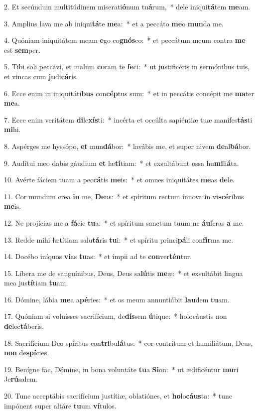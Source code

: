 2. Et secúndum multitúdinem miserati\textbf{ó}num tu\textbf{á}rum,~*  dele iniqui\textbf{tá}tem \textbf{me}am.\

3. Amplius lava me ab iniqui\textbf{tá}te \textbf{me}a:~*  et a peccáto \textbf{me}o \textbf{mun}da me.\

4. Quóniam iniquitátem meam \textbf{e}go co\textbf{gnós}co:~*  et peccátum meum contra \textbf{me} est \textbf{sem}per.\

5. Tibi soli peccávi, et malum \textbf{co}ram te \textbf{fe}ci:~*  ut justificéris in sermónibus tuis, et vincas cum \textbf{ju}di\textbf{cá}ris.\

6. Ecce enim in iniquitáti\textbf{bus} con\textbf{cép}tus sum:~*  et in peccátis concépit me \textbf{ma}ter \textbf{me}a.\

7. Ecce enim veritátem \textbf{di}le\textbf{xís}ti:~*  incérta et occúlta sapiéntiæ tuæ manifes\textbf{tás}ti \textbf{mi}hi.\

8. Aspérges me hyssópo, \textbf{et} mun\textbf{dá}bor:~*  lavábis me, et super nivem \textbf{de}al\textbf{bá}bor.\

9. Audítui meo dabis gáudium \textbf{et} læ\textbf{tí}tiam:~*  et exsultábunt ossa hu\textbf{mi}li\textbf{á}ta.\

10. Avérte fáciem tuam a pec\textbf{cá}tis \textbf{me}is:~*  et omnes iniquitátes \textbf{me}as \textbf{de}le.\

11. Cor mundum crea \textbf{in} me, \textbf{De}us:~*  et spíritum rectum ínnova in vi\textbf{scé}ribus \textbf{me}is.\

12. Ne projícias me a \textbf{fá}cie \textbf{tu}a:~*  et spíritum sanctum tuum ne \textbf{áu}feras \textbf{a} me.\

13. Redde mihi lætítiam salu\textbf{tá}ris \textbf{tu}i:~*  et spíritu princi\textbf{pá}li con\textbf{fír}ma me.\

14. Docébo iníquos \textbf{vi}as \textbf{tu}as:~*  et ímpii ad te \textbf{con}ver\textbf{tén}tur.\

15. Líbera me de sanguínibus, Deus, Deus sa\textbf{lú}tis \textbf{me}æ:~*  et exsultábit lingua mea jus\textbf{tí}tiam \textbf{tu}am.\

16. Dómine, lábia \textbf{me}a a\textbf{pé}ries:~*  et os meum annuntiábit \textbf{lau}dem \textbf{tu}am.\

17. Quóniam si voluísses sacrifícium, de\textbf{dís}sem \textbf{ú}tique:~*  holocáustis non \textbf{de}lec\textbf{tá}beris.\

18. Sacrifícium Deo spíritus con\textbf{tri}bu\textbf{lá}tus:~*  cor contrítum et humiliátum, Deus, \textbf{non} de\textbf{spí}cies.\

19. Benígne fac, Dómine, in bona voluntáte \textbf{tu}a \textbf{Si}on:~*  ut ædificéntur \textbf{mu}ri Je\textbf{rú}salem.\

20. Tunc acceptábis sacrifícium justítiæ, oblatiónes, et \textbf{ho}lo\textbf{cáus}ta:~*  tunc impónent super altáre \textbf{tu}um \textbf{ví}tulos.\

